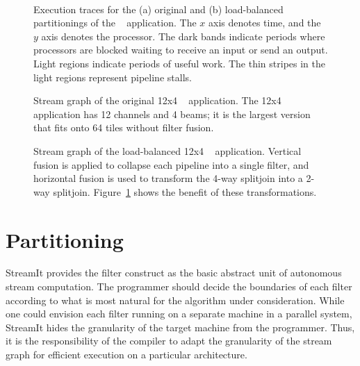 \begin{figure}
   \\
  \hspace{0.3in}  \vspace{-6pt} \caption{Execution traces for the (a)
    original and (b) load-balanced partitionings of the \Radar~
    application.  The $x$ axis denotes time, and the $y$ axis denotes
    the processor.  The dark bands indicate periods where processors
    are blocked waiting to receive an input or send an output.  Light
    regions indicate periods of useful work.  The thin stripes in the
    light regions represent pipeline
    stalls. \protect\label{fig:beam-blood}}
\end{figure}

\begin{figure}
\caption{\protect\small Stream graph of the original 12x4 \Radar~
application.  The 12x4 \Radar application has 12 channels and 4 beams;
it is the largest version that fits onto 64 tiles without filter
fusion.  \protect\label{fig:beam-orig}}
\vspace{36pt}
\caption{\protect\small Stream graph of the load-balanced 12x4
\Radar~ application.  Vertical fusion is applied to collapse each pipeline
into a single filter, and horizontal fusion is used to transform the
4-way splitjoin into a 2-way splitjoin.  Figure~\ref{fig:beam-blood}
shows the benefit of these
transformations. \protect\label{fig:beam-opt}}
\end{figure}

\section{Partitioning}
\label{sec:partition}

StreamIt provides the filter construct as the basic abstract unit of
autonomous stream computation.  The programmer should decide the
boundaries of each filter according to what is most natural for the
algorithm under consideration.  While one could envision each filter
running on a separate machine in a parallel system, StreamIt hides the
granularity of the target machine from the programmer.  Thus, it is
the responsibility of the compiler to adapt the granularity of the
stream graph for efficient execution on a particular architecture.

